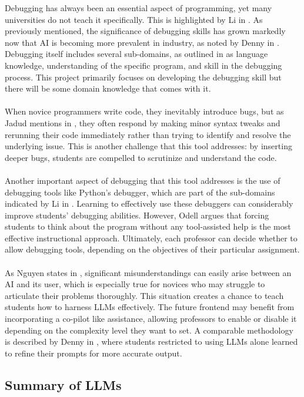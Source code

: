 \documentclass[12pt]{extarticle}
\begin{document}
Debugging has always been an essential aspect of programming, yet many universities do not teach it specifically. This is highlighted by Li in \cite{li2019}. As previously mentioned, the significance of debugging skills has grown markedly now that AI is becoming more prevalent in industry, as noted by Denny in \cite{denny2024}. Debugging itself includes several sub-domains, as outlined in \cite{li2019} as language knowledge, understanding of the specific program, and skill in the debugging process. This project primarily focuses on developing the debugging skill but there will be some domain knowledge that comes with it.\\
\\
When novice programmers write code, they inevitably introduce bugs, but as Jadud mentions in \cite{jadud2006}, they often respond by making minor syntax tweaks and rerunning their code immediately rather than trying to identify and resolve the underlying issue. This is another challenge that this tool addresses: by inserting deeper bugs, students are compelled to scrutinize and understand the code.\\
\\
Another important aspect of debugging that this tool addresses is the use of debugging tools like Python’s debugger, which are part of the sub-domains indicated by Li in \cite{li2019}. Learning to effectively use these debuggers can considerably improve students’ debugging abilities. However, Odell \cite{odell2017} argues that forcing students to think about the program without any tool-assisted help is the most effective instructional approach. Ultimately, each professor can decide whether to allow debugging tools, depending on the objectives of their particular assignment.\\
\\
As Nguyen states in \cite{nguyen2024}, significant misunderstandings can easily arise between an AI and its user, which is especially true for novices who may struggle to articulate their problems thoroughly. This situation creates a chance to teach students how to harness LLMs effectively. The future frontend may benefit from incorporating a co-pilot like assistance, allowing professors to enable or disable it depending on the complexity level they want to set. A comparable methodology is described by Denny in \cite{denny2023}, where students restricted to using LLMs alone learned to refine their prompts for more accurate output.

\subsection{Summary of LLMs}
\end{document}
